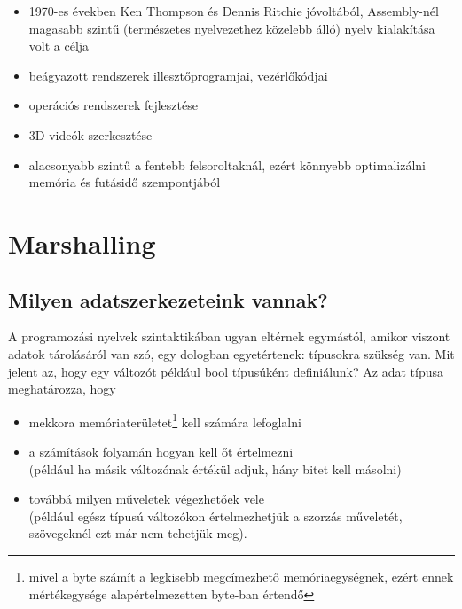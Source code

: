 \documentclass[tocnopagenum]{thesis-ekf}
\theoremstyle{definition}
\theoremstyle{remark}
\begin{document}
\begin{enumerate}
\begin{itemize}
			\item 1970-es években Ken Thompson és Dennis Ritchie jóvoltából, Assembly-nél magasabb szintű (természetes nyelvezethez közelebb álló) nyelv kialakítása volt a célja
			\item beágyazott rendszerek illesztőprogramjai, vezérlőkódjai
			\item operációs rendszerek fejlesztése
			\item 3D videók szerkesztése
			\item alacsonyabb szintű a fentebb felsoroltaknál, ezért könnyebb optimalizálni memória és futásidő szempontjából
			\cite{clang1}
		\end{itemize}
	\end{enumerate}\cite{proglanguages1}\cite{proglanguages2}
	
	\chapter{Marshalling}
	\section{Milyen adatszerkezeteink vannak?}
	A programozási nyelvek szintaktikában ugyan eltérnek egymástól, amikor viszont adatok tárolásáról van szó, egy dologban egyetértenek: típusokra szükség van. Mit jelent az, hogy egy változót például bool típusúként definiálunk? Az adat típusa meghatározza, hogy
	\begin{itemize}
		\item mekkora memóriaterületet\footnote{mivel a byte számít a legkisebb megcímezhető memóriaegységnek, ezért ennek mértékegysége alapértelmezetten byte-ban értendő} kell számára lefoglalni
		\item a számítások folyamán hogyan kell őt értelmezni\\(például ha másik változónak értékül adjuk, hány bitet kell másolni)
		\item továbbá milyen műveletek végezhetőek vele\\(például egész típusú változókon értelmezhetjük a szorzás műveletét, szövegeknél ezt már nem tehetjük meg).
	\end{itemize} \cite{adatszerkezetek_88}
\end{document}
